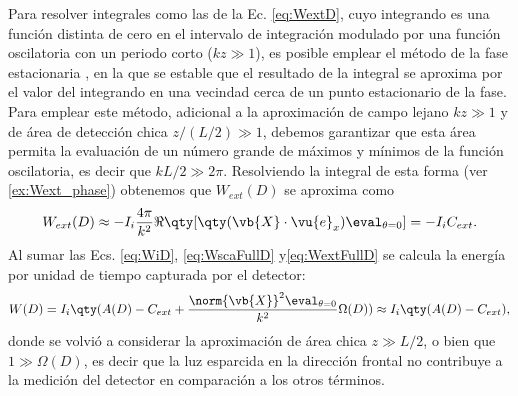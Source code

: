 %
Para resolver integrales como las de la Ec. \eqref{eq:WextD}, cuyo integrando es una función distinta de cero en el intervalo de integración modulado por una función oscilatoria con un periodo corto ($kz\gg 1$), es  posible emplear el método de la fase estacionaria \cite{hermans2011waterappendices}, en la que se estable que el resultado de la integral se aproxima por el valor del integrando en una vecindad cerca de un punto estacionario de la fase. Para emplear este método, adicional a la aproximación de campo lejano $kz\gg 1$ y de área de detección chica $z /(L/2)\gg 1$, debemos garantizar que esta área permita la evaluación de un número grande de máximos y mínimos de la función oscilatoria, es decir que $kL/2\gg 2\pi$. Resolviendo la integral de esta forma (ver \ref{ex:Wext_phase}) obtenemos que $W_{ext}(D)$ se aproxima como 
%
\begin{align}
W_{ext}(D) \approx - I_i \frac{4\pi}{k^2}\Re\qty[ \qty(\vb{X}\cdot\vu{e}_x)\eval_{\theta = 0}] = -I_iC_{ext}.
\label{eq:WextFullD}
\end{align}
%
Al sumar las Ecs. \eqref{eq:WiD}, \eqref{eq:WscaFullD} y\eqref{eq:WextFullD} se calcula la energía por unidad de tiempo capturada por el detector:
%
\begin{align}
W(D) = I_i \qty(A(D) - C_{ext} + \frac{\norm{\vb{X}}^2\eval_{\theta = 0}}{k^2}\Omega(D) ) \approx I_i \qty(A(D) - C_{ext}  ),
\label{eq:WD}
\end{align}
%
donde se volvió a considerar la aproximación de área chica $z\gg L/2$, o bien que $1\gg\Omega(D)$, es decir que la luz esparcida en la dirección frontal no contribuye a la medición  del detector en comparación a los otros términos.

